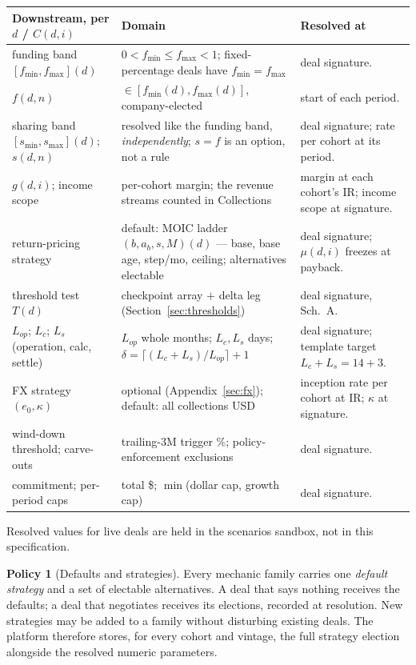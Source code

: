 \documentclass[11pt, a4paper]{article}
\theoremstyle{definition}
\newtheorem{policy}{Policy}
\begin{document}
\begin{center}
\begin{tabular}{@{} L{3.6cm} L{4.6cm} L{5.6cm} @{}}
\toprule
\textbf{Downstream, per $d$ / $C(d,i)$} & \textbf{Domain} & \textbf{Resolved at} \\
\midrule
funding band $[f_{\min}, f_{\max}](d)$ & $0 < f_{\min} \leq f_{\max} < 1$; fixed-percentage deals have $f_{\min} = f_{\max}$ & deal signature. \\[3pt]
$f(d, n)$ & $\in [f_{\min}(d), f_{\max}(d)]$, company-elected & start of each period. \\[3pt]
sharing band $[s_{\min}, s_{\max}](d)$; $s(d,n)$ & resolved like the funding band, \emph{independently}; $s = f$ is an option, not a rule & deal signature; rate per cohort at its period. \\[3pt]
$g(d,i)$; income scope & per-cohort margin; the revenue streams counted in Collections & margin at each cohort's IR; income scope at signature. \\[3pt]
return-pricing strategy & default: MOIC ladder $(b, a_b, s, M)(d)$ --- base, base age, step/mo, ceiling; alternatives electable & deal signature; $\mu(d,i)$ freezes at payback. \\[3pt]
threshold test $T(d)$ & checkpoint array $+$ delta leg (Section~\ref{sec:thresholds}) & deal signature, Sch.~A. \\[3pt]
$L_{op}$; $L_c$; $L_s$ (operation, calc, settle) & $L_{op}$ whole months; $L_c, L_s$ days; $\delta = \lceil(L_c{+}L_s)/L_{op}\rceil {+} 1$ & deal signature; template target $L_c{+}L_s = 14{+}3$. \\[3pt]
FX strategy $(e_0, \kappa)$ & optional (Appendix~\ref{sec:fx}); default: all collections USD & inception rate per cohort at IR; $\kappa$ at signature. \\[3pt]
wind-down threshold; carve-outs & trailing-3M trigger \%; policy-enforcement exclusions & deal signature. \\[3pt]
commitment; per-period caps & total \$; $\min$(dollar cap, growth cap) & deal signature. \\
\bottomrule
\end{tabular}
\end{center}

Resolved values for live deals are held in the scenarios sandbox, not in this specification.

\begin{policy}[Defaults and strategies]\label{pol:defaults}
Every mechanic family carries one \emph{default strategy} and a set of electable alternatives. A deal that says nothing receives the defaults; a deal that negotiates receives its elections, recorded at resolution. New strategies may be added to a family without disturbing existing deals. The platform therefore stores, for every cohort and vintage, the full strategy election alongside the resolved numeric parameters.
\end{policy}
\end{document}
